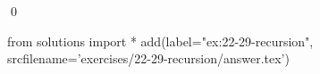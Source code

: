 
\begin{ex}
  \label{ex:22-29-recursion}
  
  \qed
\end{ex}
\begin{python0}
from solutions import *
add(label="ex:22-29-recursion",
    srcfilename='exercises/22-29-recursion/answer.tex')
\end{python0}
